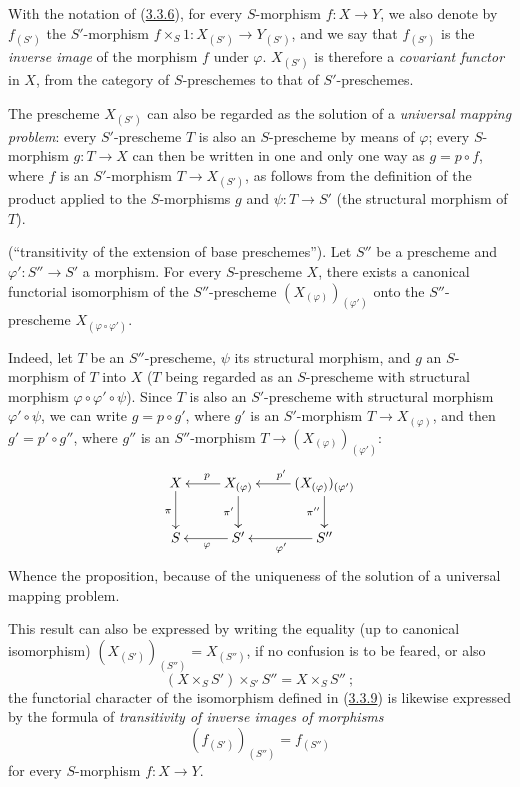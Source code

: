 \begin{env}[3.3.7]
\label{I.3.3.7}
With the notation of (\hyperref[I.3.3.6]{3.3.6}), for every
$S$-morphism $f:X\to Y$, we also denote by $f_{(S')}$ the $S'$-morphism
$f\times_S 1:X_{(S')}\to Y_{(S')}$, and we say that $f_{(S')}$ is
the \emph{inverse image} of the morphism $f$ under $\varphi$. $X_{(S')}$ is
therefore a \emph{covariant functor} in $X$, from the category of
$S$-preschemes to that of $S'$-preschemes.
\end{env}

\begin{env}[3.3.8]
\label{I.3.3.8}
The prescheme $X_{(S')}$ can also be regarded as the solution of a
\emph{universal mapping problem}: every $S'$-prescheme $T$ is also
an $S$-prescheme by means of $\varphi$; every $S$-morphism $g:T\to X$
can then be written in one and only one way as $g=p\circ f$, where $f$ is an
$S'$-morphism $T\to X_{(S')}$, as follows from the definition of the product
applied to the $S$-morphisms $g$ and $\psi:T\to S'$ (the structural morphism
of $T$).
\end{env}

\begin{proposition}[3.3.9]
\label{I.3.3.9}
\textup{(``transitivity of the extension of base preschemes'').} Let
$S''$ be a prescheme and $\varphi':S''\to S'$ a morphism. For every
$S$-prescheme $X$, there exists a canonical functorial isomorphism of the
$S''$-prescheme $(X_{(\varphi)})_{(\varphi')}$ onto the $S''$-prescheme
$X_{(\varphi\circ\varphi')}$.
\end{proposition}

Indeed, let $T$ be an $S''$-prescheme, $\psi$ its structural morphism, and
$g$ an $S$-morphism of $T$ into $X$ ($T$ being regarded as an
$S$-prescheme with structural morphism $\varphi\circ\varphi'\circ\psi$).
Since $T$ is also an $S'$-prescheme with structural morphism
$\varphi'\circ\psi$, we can write $g=p\circ g'$, where $g'$ is an
$S'$-morphism $T\to X_{(\varphi)}$, and then $g'=p'\circ g''$, where $g''$ is
an $S''$-morphism $T\to(X_{(\varphi)})_{(\varphi')}$:
\label{I.3.3.9.transitivity-diagram}
\[
  \xymatrix{
    X\ar[d]_{\pi} &
    X_{(\varphi)}\ar[l]_{p}\ar[d]_{\pi'} &
    (X_{(\varphi)})_{(\varphi')}\ar[l]_{p'}\ar[d]_{\pi''}\\
    S & S'\ar[l]^{\varphi} & S''\ar[l]^{\varphi'}
  }
\]
Whence the proposition, because of the uniqueness of the solution of a
universal mapping problem.

This result can also be expressed by writing the equality (up to canonical
isomorphism) $(X_{(S')})_{(S'')}=X_{(S'')}$, if no confusion is to be
feared, or also
\begin{equation}
  (X\times_S S')\times_{S'}S''=X\times_S S''~;
  \tag{3.3.9.1}\label{I.3.3.9.1}
\end{equation}
the functorial character of the isomorphism defined in
(\hyperref[I.3.3.9]{3.3.9}) is likewise expressed by the formula of
\emph{transitivity of inverse images of morphisms}
\begin{equation}
  (f_{(S')})_{(S'')}=f_{(S'')}
  \tag{3.3.9.2}\label{I.3.3.9.2}
\end{equation}
for every $S$-morphism $f:X\to Y$.


